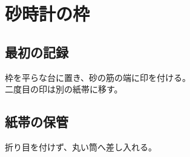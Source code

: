\documentclass[uplatex,a4paper,10pt,oneside]{jsreport}
\begin{document}
\chapter{砂時計の枠}
\section{最初の記録}
枠を平らな台に置き、砂の筋の端に印を付ける。\\
二度目の印は別の紙帯に移す。
\section{紙帯の保管}
折り目を付けず、丸い筒へ差し入れる。
\end{document}
